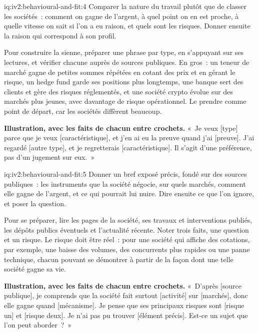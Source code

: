 \begin{solution}{iq:iv2:behavioural-and-fit:4}
Comparer la nature du travail plutôt que de classer les sociétés~: comment on gagne de l'argent, à quel point on en est proche, à quelle vitesse on sait si l'on a eu raison, et quels sont les risques. Donner ensuite la raison qui correspond à son profil.

Pour construire la sienne, préparer une phrase par type, en s'appuyant sur ses lectures, et vérifier chacune auprès de sources publiques. En gros~: un teneur de marché gagne de petites sommes répétées en cotant des prix et en gérant le risque, un hedge fund garde ses positions plus longtemps, une banque sert des clients et gère des risques réglementés, et une société crypto évolue sur des marchés plus jeunes, avec davantage de risque opérationnel. Le prendre comme point de départ, car les sociétés diffèrent beaucoup.

\textbf{Illustration, avec les faits de chacun entre crochets.} «~Je veux [type] parce que je veux [caractéristique], et j'en ai eu la preuve quand j'ai [preuve]. J'ai regardé [autre type], et je regretterais [caractéristique]. Il s'agit d'une préférence, pas d'un jugement sur eux.~»

\end{solution}

\begin{solution}{iq:iv2:behavioural-and-fit:5}
Donner un bref exposé précis, fondé sur des sources publiques~: les instruments que la société négocie, sur quels marchés, comment elle gagne de l'argent, et ce qui pourrait lui nuire. Dire ensuite ce que l'on ignore, et poser la question.

Pour se préparer, lire les pages de la société, ses travaux et interventions publiés, les dépôts publics éventuels et l'actualité récente. Noter trois faits, une question et un risque. Le risque doit être réel~: pour une société qui affiche des cotations, par exemple, une baisse des volumes, des concurrents plus rapides ou une panne technique, chacun pouvant se démontrer à partir de la façon dont une telle société gagne sa vie.

\textbf{Illustration, avec les faits de chacun entre crochets.} «~D'après [source publique], je comprends que la société fait surtout [activité] sur [marchés], donc elle gagne quand [mécanisme]. Je pense que ses principaux risques sont [risque un] et [risque deux]. Je n'ai pas pu trouver [élément précis]. Est-ce un sujet que l'on peut aborder~?~»

\end{solution}


